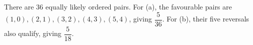 There are 36 equally likely ordered pairs. For (a), the favourable pairs are $(1,0),(2,1),(3,2),(4,3),(5,4)$, giving $\boxed{\dfrac{5}{36}}$. For (b), their five reversals also qualify, giving $\boxed{\dfrac{5}{18}}$.
